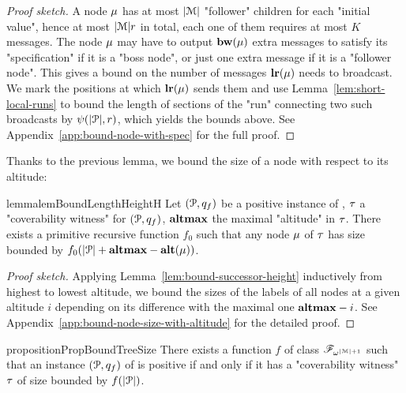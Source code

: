 \begin{proof}[Proof sketch]
	A node $\mu$ has at most $|\mathcal{M}|$ "follower" children for each "initial value", hence at most $|\mathcal{M}|r$ in total, each one of them requires at most $K$ messages. The node $\mu$ may have to output $\mathbf{bw}(\mu)$ extra messages to satisfy its "specification" if it is a "boss node", or just one extra message if it is a "follower node".
	This gives a bound on the number of messages $\mathbf{lr}(\mu)$ needs to broadcast. We mark the positions at which $\mathbf{lr}(\mu)$ sends them and use Lemma~\ref{lem:short-local-runs} to bound the length of sections of the "run" connecting two such broadcasts by $\psi(|\mathcal{P}|,r)$, which yields the bounds above. See Appendix~\ref{app:bound-node-with-spec} for the full proof.
\end{proof}

Thanks to the previous lemma, we bound the size of a node with respect to its altitude: 
\begin{restatable}{lemma}{lemBoundLengthHeightH}
	\label{lem:bound-length-at-height-h}
	Let $(\mathcal{P},q_f)$ be a positive instance of \COVER, $\tau$ a "coverability witness" for $(\mathcal{P},q_f)$, $\mathbf{altmax}$ the maximal "altitude" in $\tau$. There exists a primitive recursive function $f_0$ such that any node $\mu$ of $\tau$ has size bounded by $f_0(|\mathcal{P}| + \mathbf{altmax} - \mathbf{alt}(\mu))$.
\end{restatable}
\begin{proof}[Proof sketch]
Applying Lemma~\ref{lem:bound-successor-height} inductively from highest to lowest altitude, we bound the sizes of the labels of all nodes at a given altitude $i$ depending on its difference with the maximal one $\mathbf{altmax}-i$.
See Appendix~\ref{app:bound-node-size-with-altitude} for the detailed proof. 
\end{proof}
 
\begin{restatable}{proposition}{PropBoundTreeSize}
	\label{prop:bound-tree-size}
	There exists a function $f$ of class $\mathscr{F}_{\omega^{|\mathcal{M}|+1}}$ such that an instance $(\mathcal{P},q_f)$ of \COVER is positive if and only if it has a "coverability witness" $\tau$ of size bounded by $f(|\mathcal{P}|)$.
\end{restatable}

